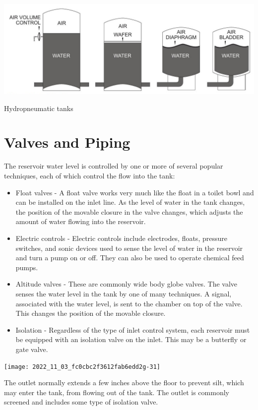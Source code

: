 \documentclass[10pt]{article}
\begin{document}
\includegraphics[max width=\textwidth]{2022_11_03_fc0cbc2f3612fab6edd2g-30(2)}

Hydropneumatic tanks

\section{Valves and Piping}
The reservoir water level is controlled by one or more of several popular techniques, each of which control the flow into the tank:

\begin{itemize}
  \item Float valves - A float valve works very much like the float in a toilet bowl and can be installed on the inlet line. As the level of water in the tank changes, the position of the movable closure in the valve changes, which adjusts the amount of water flowing into the reservoir.

  \item Electric controls - Electric controls include electrodes, floats, pressure switches, and sonic devices used to sense the level of water in the reservoir and turn a pump on or off. They can also be used to operate chemical feed pumps.

  \item Altitude valves - These are commonly wide body globe valves. The valve senses the water level in the tank by one of many techniques. A signal, associated with the water level, is sent to the chamber on top of the valve. This changes the position of the movable closure.

  \item Isolation - Regardless of the type of inlet control system, each reservoir must be equipped with an isolation valve on the inlet. This may be a butterfly or gate valve.

\end{itemize}
\texttt{[image: 2022\_11\_03\_fc0cbc2f3612fab6edd2g-31]}

The outlet normally extends a few inches above the floor to prevent silt, which may enter the tank, from flowing out of the tank. The outlet is commonly screened and includes some type of isolation valve.
\end{document}
